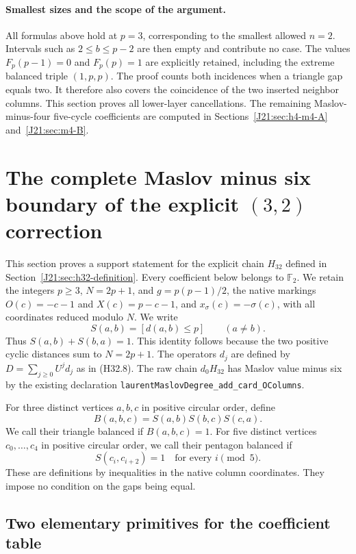 \documentclass[11pt,oneside]{report}
\theoremstyle{definition}
\numberwithin{equation}{section}
\newcommand{\decl}[1]{\textnormal{\nolinkurl{#1}}}
\begin{document}
\paragraph{Smallest sizes and the scope of the argument.}
All formulas above hold at $p=3$, corresponding to the smallest
allowed $n=2$.
Intervals such as $2\leq b\leq p-2$ are then empty and contribute
no case. The values $F_p(p-1)=0$ and $F_p(p)=1$ are explicitly
retained, including the extreme balanced triple $(1,p,p)$.
The proof counts both incidences when a triangle gap equals two.
It therefore also covers the coincidence of the two inserted
neighbor columns.
This section proves all lower-layer cancellations.
The remaining Maslov-minus-four five-cycle coefficients are computed
in Sections~\ref{J21:sec:h4-m4-A} and~\ref{J21:sec:m4-B}.


\section{The complete Maslov minus six boundary of the explicit \texorpdfstring{$(3,2)$}{(3,2)} correction}
\label{J21:sec:h32-m6}

This section proves a support statement for the explicit chain $H_{32}$
defined in Section~\ref{J21:sec:h32-definition}. Every coefficient below belongs
to $\mathbb F _2$. We retain the integers $p\geq3$, $N=2p+1$, and
$g=p(p-1)/2$, the native markings $O(c)=-c-1$ and $X(c)=p-c-1$, and
$x_\sigma(c)=-\sigma(c)$, with all coordinates reduced modulo $N$.
We write
\[
 S(a,b)=[d(a,b)\leq p]\qquad(a\neq b).
\]
Thus $S(a,b)+S(b,a)=1$. This identity follows because the two positive
cyclic distances sum to $N=2p+1$.
The operators $d_j$ are defined by $D=\sum_{j\geq0}U^j d_j$ as in
(H32.8). The raw chain $d_0H_{32}$ has Maslov value minus six by the
existing declaration
\decl{laurentMaslovDegree_add_card_OColumns}.

For three distinct vertices $a,b,c$ in positive circular order, define
\[
 B(a,b,c)=S(a,b)S(b,c)S(c,a).
 \tag{M6.1}
\]
We call their triangle balanced if $B(a,b,c)=1$.
For five distinct vertices $c_0,\ldots,c_4$ in positive circular order,
we call their pentagon balanced if
\[
             S(c_i,c_{i+2})=1\quad\text{for every }i\pmod5.
 \tag{M6.2}
\]
These are definitions by inequalities in the native column coordinates.
They impose no condition on the gaps being equal.

\subsection{Two elementary primitives for the coefficient table}
\end{document}
